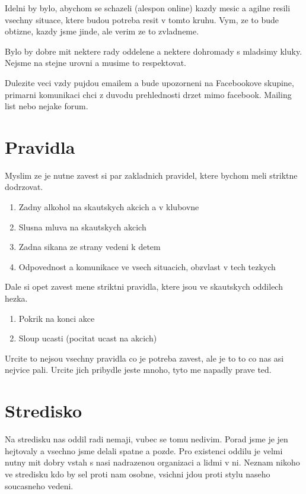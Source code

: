 \documentclass[12pt,a4paper]{article}
\begin{document}
Idelni by bylo, abychom se schazeli (alespon online) kazdy mesic a agilne resili vsechny situace, ktere budou potreba resit v tomto kruhu. Vym, ze to bude obtizne, kazdy jsme jinde, ale verim ze to zvladneme.

Bylo by dobre mit nektere rady oddelene a nektere dohromady s mladsimy kluky. Nejsme na stejne urovni a musime to respektovat.

Dulezite veci vzdy pujdou emailem a bude upozorneni na Facebookove skupine, primarni komunikaci chci z duvodu prehlednosti drzet mimo facebook. Mailing list nebo nejake forum.

\section{Pravidla}

Myslim ze je nutne zavest si par zakladnich pravidel, ktere bychom meli striktne dodrzovat.

\begin{enumerate}
\item Zadny alkohol na skautskych akcich a v klubovne
\item Slusna mluva na skautskych akcich
\item Zadna sikana ze strany vedeni k detem
\item Odpovednost a komunikace ve vsech situacich, obzvlast v tech tezkych
\end{enumerate}

Dale si opet zavest mene striktni pravidla, ktere jsou ve skautskych oddilech hezka.

\begin{enumerate}
\item Pokrik na konci akce
\item Sloup ucasti (pocitat ucast na akcich)
\end{enumerate}

Urcite to nejsou vsechny pravidla co je potreba zavest, ale je to to co nas asi nejvice pali. Urcite jich pribydle jeste mnoho, tyto me napadly prave ted.

\section{Stredisko}

Na stredisku nas oddil radi nemaji, vubec se tomu nedivim. Porad jsme je jen hejtovaly a vsechno jsme delali spatne a pozde. Pro existenci oddilu je velmi nutny mit dobry vstah s nasi nadrazenou organizaci a lidmi v ni. Neznam nikoho ve stredisku kdo by sel proti nam osobne, vsichni jdou proti stylu naseho soucasneho vedeni.
\end{document}

